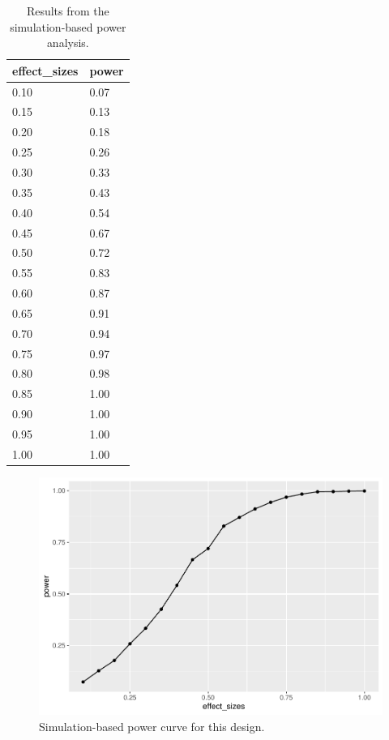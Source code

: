 \documentclass[
  english,
  man]{apa6}
\begin{document}
\begin{table}[tbp]

\begin{center}
\begin{threeparttable}

\caption{\label{tab:unnamed-chunk-16}Results from the simulation-based power analysis.}

\begin{tabular}{ll}
\toprule
effect\_sizes & \multicolumn{1}{c}{power}\\
\midrule
0.10 & 0.07\\
0.15 & 0.13\\
0.20 & 0.18\\
0.25 & 0.26\\
0.30 & 0.33\\
0.35 & 0.43\\
0.40 & 0.54\\
0.45 & 0.67\\
0.50 & 0.72\\
0.55 & 0.83\\
0.60 & 0.87\\
0.65 & 0.91\\
0.70 & 0.94\\
0.75 & 0.97\\
0.80 & 0.98\\
0.85 & 1.00\\
0.90 & 1.00\\
0.95 & 1.00\\
1.00 & 1.00\\
\bottomrule
\end{tabular}

\end{threeparttable}
\end{center}

\end{table}

\begin{figure}
\centering
\includegraphics{APA_report_files/figure-latex/unnamed-chunk-17-1.pdf}
\caption{\label{fig:unnamed-chunk-17}Simulation-based power curve for this design.}
\end{figure}
\end{document}
